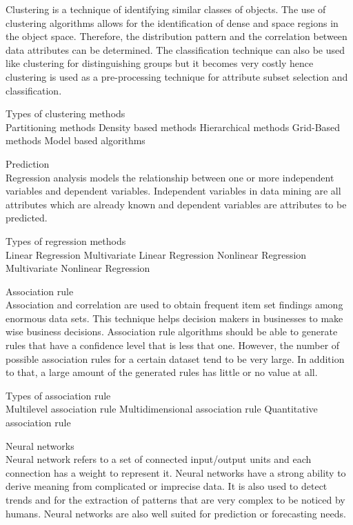 \documentclass[conference]{IEEEtran}
\begin{document}
Clustering is a technique of identifying similar classes of objects. The use of clustering algorithms allows for the identification of dense and space regions in the object space. Therefore, the distribution pattern and the correlation between data attributes can be determined. The classification technique can also be used like clustering for distinguishing groups but it becomes very costly hence clustering is used as a pre-processing technique for attribute subset selection and classification.


Types of clustering methods\\

Partitioning methods
Density based methods
Hierarchical methods
Grid-Based methods
Model based algorithms 


Prediction\\


Regression analysis models the relationship between one or more independent variables and dependent variables. Independent variables in data mining are all attributes which are already known and dependent variables are attributes to be predicted.

Types of regression methods \\

Linear Regression 
Multivariate Linear Regression 
Nonlinear Regression 
Multivariate Nonlinear Regression


Association rule\\

Association and correlation are used to obtain frequent item set findings among enormous data sets. This technique helps decision makers in businesses to make wise business decisions. Association rule algorithms should be able to generate rules that have a confidence level that is less that one. However, the number of possible association rules for a certain dataset tend to be very large. In addition to that, a large amount of the generated rules has little or no value at all.

Types of association rule \\

Multilevel association rule
Multidimensional association rule 
Quantitative association rule


Neural networks	\\

Neural network refers to a set of connected input/output units and each connection has a weight to represent it. Neural networks have a strong ability to derive meaning from complicated or imprecise data. It is also used to detect trends and for the extraction of patterns that are very complex to be noticed by humans. Neural networks are also well suited for prediction or forecasting needs. 
\end{document}
